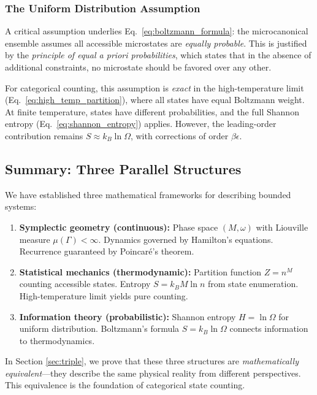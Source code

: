 \documentclass[twocolumn,10pt]{article}
\theoremstyle{remark}
\begin{document}
\subsubsection{The Uniform Distribution Assumption}

A critical assumption underlies Eq.~\eqref{eq:boltzmann_formula}: the microcanonical ensemble assumes all accessible microstates are \textit{equally probable}. This is justified by the \textit{principle of equal a priori probabilities}, which states that in the absence of additional constraints, no microstate should be favored over any other.

For categorical counting, this assumption is \textit{exact} in the high-temperature limit (Eq.~\eqref{eq:high_temp_partition}), where all states have equal Boltzmann weight. At finite temperature, states have different probabilities, and the full Shannon entropy (Eq.~\eqref{eq:shannon_entropy}) applies. However, the leading-order contribution remains $S \approx k_B \ln \Omega$, with corrections of order $\beta \epsilon$.

\subsection{Summary: Three Parallel Structures}

We have established three mathematical frameworks for describing bounded systems:

\begin{enumerate}
    \item \textbf{Symplectic geometry (continuous):} Phase space $(M, \omega)$ with Liouville measure $\mu(\Gamma) < \infty$. Dynamics governed by Hamilton's equations. Recurrence guaranteed by Poincaré's theorem.
    
    \item \textbf{Statistical mechanics (thermodynamic):} Partition function $Z = n^M$ counting accessible states. Entropy $S = k_B M \ln n$ from state enumeration. High-temperature limit yields pure counting.
    
    \item \textbf{Information theory (probabilistic):} Shannon entropy $H = \ln \Omega$ for uniform distribution. Boltzmann's formula $S = k_B \ln \Omega$ connects information to thermodynamics.
\end{enumerate}

In Section \ref{sec:triple}, we prove that these three structures are \textit{mathematically equivalent}—they describe the same physical reality from different perspectives. This equivalence is the foundation of categorical state counting.
\end{document}
